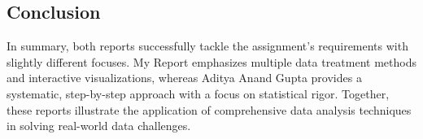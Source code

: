 \subsection*{Conclusion}
In summary, both reports successfully tackle the assignment's requirements with slightly different focuses. My Report emphasizes multiple data treatment methods and interactive visualizations, whereas Aditya Anand Gupta provides a systematic, step-by-step approach with a focus on statistical rigor. Together, these reports illustrate the application of comprehensive data analysis techniques in solving real-world data challenges.
